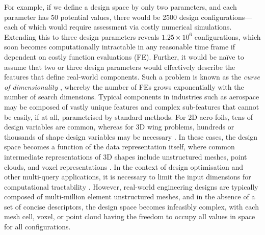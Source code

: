 \documentclass{article}
\begin{document}
For example, if we define a design space by only two parameters, and each parameter has 50 potential values, there would be 2500 design configurations—each of which would require assessment via costly numerical simulations. Extending this to three design parameters reveals $1.25 \times 10^6$
configurations, which soon becomes computationally intractable in any reasonable time frame if dependent on costly function evaluations (FE). Further, it would be naïve to assume that two or three design parameters would effectively describe the features that define real-world components. Such a problem is known as the \textit{curse of dimensionality} \citep{Keogh2017}, whereby the number of FEs grows exponentially with the number of search dimensions. Typical components in industries such as aerospace may be composed of vastly unique features and complex sub-features that cannot be easily, if at all, parametrised by standard methods. For 2D aero-foils, tens of design variables are common, whereas for 3D wing problems, hundreds or thousands of shape design variables may be necessary \citep{Jabn2024}. In these cases, the design space becomes a function of the data representation itself, where common intermediate representations of 3D shapes include unstructured meshes, point clouds, and voxel representations \citep{Jabn2024}. In the context of design optimisation and other multi-query applications, it is necessary to limit the input dimensions for computational tractability \citep{Jabn2024}. However, real-world engineering designs are typically composed of multi-million element unstructured meshes, and in the absence of a set of concise descriptors, the design space becomes infeasibly complex, with each mesh cell, voxel, or point cloud having the freedom to occupy all values in space for all configurations. 

\end{document}
